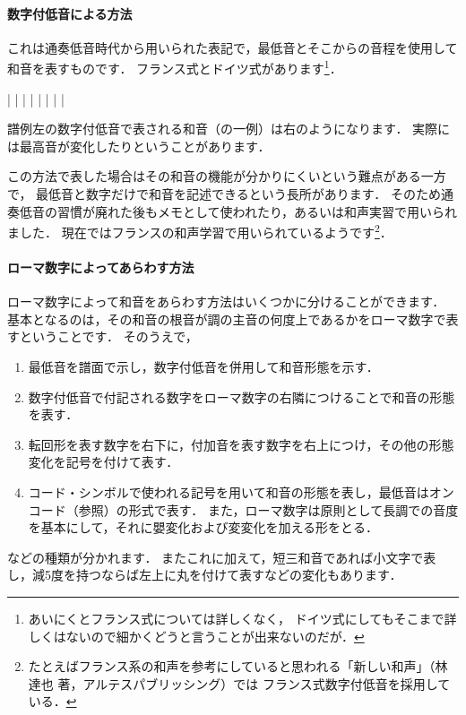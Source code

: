 \documentclass[dvipdfmx,uplatex,b5paper,openany,jbase=12Q,nomag*,textwidth-limit=44%
               ]{gachimuchi}
\begin{document}
\paragraph{数字付低音による方法}
これは通奏低音時代から用いられた表記で，最低音とそこからの音程を使用して和音を表すものです．
フランス式とドイツ式があります\footnote{あいにくとフランス式については詳しくなく，
ドイツ式にしてもそこまで詳しくはないので細かくどうと言うことが出来ないのだが．
}．
\begin{floatMusic}[pos=ht,width=0.9\linewidth]
  \Startpiece%
  \Notes%
  \figbassu[6]%
  \figbassu[4][6]%
  \figbassu[7]%
  \figbassu[5][6]%
  \figbassu[3][4][6]%
  \figbassu[2]%
  |%
  \en\doublebar%
  \Notes%
  |\prevstaff%
  \en\Notes
  \figbassu[6]|%
  \en\Notes
  \figbassu[4][6]|%
  \en\Notes
  \figbassu[7]|%
  \en\Notes
  \figbassu[5][6]|%
  \en\Notes
  \figbassu[3][4][6]|%
  \en\Notes
  \figbassu[2]|%
  \en\setdoublebar%
  \endpiece%
\end{floatMusic}

譜例左の数字付低音で表される和音（の一例）は右のようになります．
実際には最高音が変化したりということがあります．

この方法で表した場合はその和音の機能が分かりにくいという難点がある一方で，
最低音と数字だけで和音を記述できるという長所があります．
そのため通奏低音の習慣が廃れた後もメモとして使われたり，あるいは和声実習で用いられました．
現在ではフランスの和声学習で用いられているようです\footnote{%
たとえばフランス系の和声を参考にしていると思われる「新しい和声」（林 達也 著，アルテスパブリッシング）では
フランス式数字付低音を採用している．}．

\paragraph{ローマ数字によってあらわす方法}
ローマ数字によって和音をあらわす方法はいくつかに分けることができます．
基本となるのは，その和音の根音が調の主音の何度上であるかをローマ数字で表すということです．
そのうえで，
\begin{enumerate}
  \item 最低音を譜面で示し，数字付低音を併用して和音形態を示す．
  \item 数字付低音で付記される数字をローマ数字の右隣につけることで和音の形態を表す．
  \item 転回形を表す数字を右下に，付加音を表す数字を右上につけ，その他の形態変化を記号を付けて表す．
  \item コード・シンボルで使われる記号を用いて和音の形態を表し，最低音はオンコード（参照）の形式で表す．
        また，ローマ数字は原則として長調での音度を基本にして，それに嬰変化および変変化を加える形をとる．
\end{enumerate}
などの種類が分かれます．
またこれに加えて，短三和音であれば小文字で表し，減5度を持つならば左上に丸を付けて表すなどの変化もあります．
\end{document}
